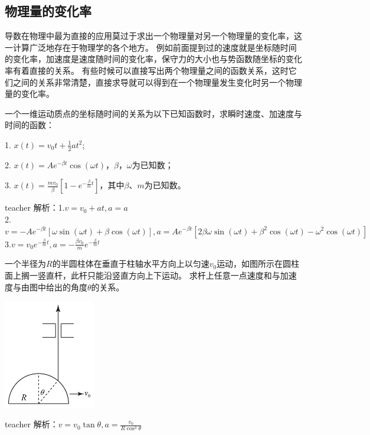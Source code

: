 \subsection{物理量的变化率}

导数在物理中最为直接的应用莫过于求出一个物理量对另一个物理量的变化率，这一计算广泛地存在于物理学的各个地方。
例如前面提到过的速度就是坐标随时间的变化率，加速度是速度随时间的变化率，保守力的大小也与势函数随坐标的变化率有着直接的关系。
有些时候可以直接写出两个物理量之间的函数关系，这时它们之间的关系非常清楚，直接求导就可以得到在一个物理量发生变化时另一个物理量的变化率。

\begin{example}
	一个一维运动质点的坐标随时间的关系为以下已知函数时，求瞬时速度、加速度与时间的函数：
	
	1. $x(t) = v_0 t+\frac{1}{2}at^2$;
	
	2. $x(t) = Ae^{-\beta t}\cos(\omega t)$，$\beta$，$\omega$为已知数；
	
	3. $x(t) = \frac{mv_0}{\beta}\left[1-e^{-\frac{\beta}{m}t}\right]$，其中$\beta$、$m$为已知数。
	\begin{taggedblock}{teacher}
		\newline
		解析：1.$v=v_0+at,a=a$
		\\2.$v=-Ae^{-\beta t}[\omega\sin(\omega t)+\beta\cos(\omega t)],a=Ae^{-\beta t}[2\beta\omega\sin(\omega t)+\beta^2\cos(\omega t)-\omega^2\cos(\omega t)]$
		\\3.$v=v_0e^{-\frac{\beta}{m}t},a=-\frac{\beta v_0}{m}e^{-\frac{\beta}{m}t}$
	\end{taggedblock}
\end{example}%

\begin{example}
	一个半径为$R$的半圆柱体在垂直于柱轴水平方向上以匀速$v_0$运动，如图所示在圆柱面上搁一竖直杆，此杆只能沿竖直方向上下运动。
	求杆上任意一点速度和与加速度与由图中给出的角度$\theta$的关系。
	\begin{flushright}
		\includegraphics[width = 0.3\textwidth]{images/motion-44.pdf} 
	\end{flushright}
	\begin{taggedblock}{teacher}
		\noindent
		解析：$v=v_0\tan\theta,a=\frac{v_0}{R\cos^3\theta}$
	\end{taggedblock}
\end{example}%


